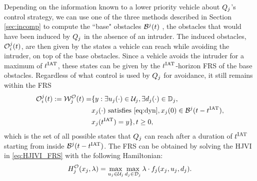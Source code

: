 Depending on the information known to a lower priority vehicle about $Q_j$'s control strategy, we can use one of the three methods described in Section \ref{sec:incomp} to compute the ``base" obstacles $\mathcal{B}^j(t)$ , the obstacles that would have been induced by $Q_j$ in the absence of an intruder. The induced obstacles, $\mathcal{O}_i^j(t)$, are then given by the states a vehicle can reach while avoiding the intruder, on top of the base obstacles. Since a vehicle avoids the intruder for a maximum of $t^\text{IAT}$, these states can be given by the $t^\text{IAT}$-horizon FRS of the base obstacles. Regardless of what control is used by $Q_j$ for avoidance, it still remains within the FRS 
\begin{equation} \label{eq:intObs}
\begin{aligned}
\ioset_i^j(t) := \frs_{j}^{\mathcal{O}}(t) = & \{y: \exists \ctrl_j(\cdot) \in \cset_j, \exists \dstb_j(\cdot) \in \dfset_j, \\
& \state_j(\cdot) \text{ satisfies \eqref{eq:dyn}}, \state_j(0) \in \boset^j(t-\iat), \\
& \state_j(\iat) = y\}, t \geq 0, 
\end{aligned}
\end{equation}
which is the set of all possible states that $Q_j$ can reach after a duration of $t^\text{IAT}$ starting from inside $\mathcal{B}^j(t-t^\text{IAT})$. The FRS can be obtained by solving the HJVI in \eqref{eq:HJIVI_FRS} with the following Hamiltonian:
\begin{equation}
\ham_{j}^{\mathcal{O}}(\state_j, \costate) = \max_{\ctrl_j \in \cset_j} \max_{\dstb_j \in \dset_j} \costate \cdot f_j (\state_j, \ctrl_j, \dstb_j) \label{intobs2}.
\end{equation} 
%
%

